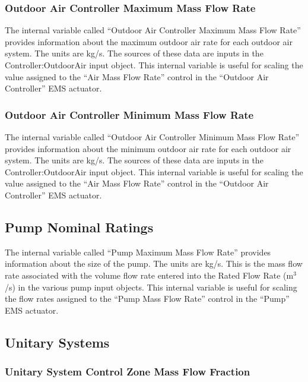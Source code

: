 \subsubsection{Outdoor Air Controller Maximum Mass Flow Rate}\label{outdoor-air-controller-maximum-mass-flow-rate}

The internal variable called ``Outdoor Air Controller Maximum Mass Flow Rate'' provides information about the maximum outdoor air rate for each outdoor air system. The units are kg/s. The sources of these data are inputs in the Controller:OutdoorAir input object. This internal variable is useful for scaling the value assigned to the ``Air Mass Flow Rate'' control in the ``Outdoor Air Controller'' EMS actuator.

\subsubsection{Outdoor Air Controller Minimum Mass Flow Rate}\label{outdoor-air-controller-minimum-mass-flow-rate}

The internal variable called ``Outdoor Air Controller Minimum Mass Flow Rate'' provides information about the minimum outdoor air rate for each outdoor air system. The units are kg/s. The sources of these data are inputs in the Controller:OutdoorAir input object. This internal variable is useful for scaling the value assigned to the ``Air Mass Flow Rate'' control in the ``Outdoor Air Controller'' EMS actuator.

\subsection{Pump Nominal Ratings}\label{pump-nominal-ratings}

The internal variable called ``Pump Maximum Mass Flow Rate'' provides information about the size of the pump. The units are kg/s. This is the mass flow rate associated with the volume flow rate entered into the Rated Flow Rate (m\(^{3}\)/s) in the various pump input objects. This internal variable is useful for scaling the flow rates assigned to the ``Pump Mass Flow Rate'' control in the ``Pump'' EMS actuator.

\subsection{Unitary Systems}\label{unitary-systems}

\subsubsection{Unitary System Control Zone Mass Flow Fraction}\label{unitary-system-control-zone-mass-flow-fraction}

